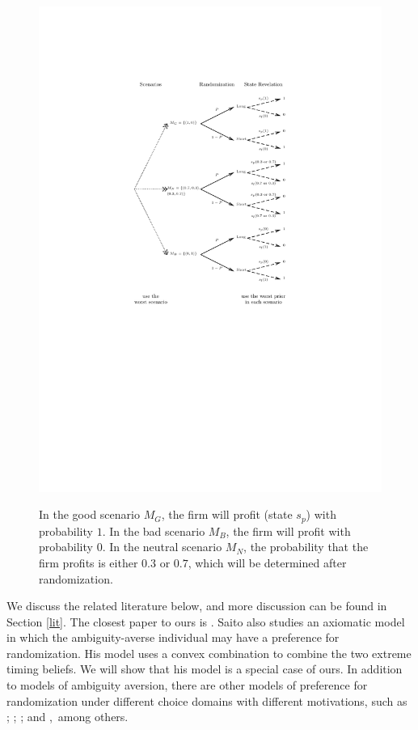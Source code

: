 \documentclass[12pt, notitlepage]{article}
\begin{document}
\begin{figure}[h!]
  \centering   \label{fig_intro_eg3}
    \includegraphics{img/intro_eg3.pdf}
    \caption{In the good
scenario $M_{G}$, the firm will profit (state $s_{p}$) with probability $1$.
In the bad scenario $M_{B}$, the firm will profit with probability $0$. In
the neutral scenario $M_{N}$, the probability that the firm profits is
either $0.3$ or $0.7$, which will be determined after randomization.}
\end{figure}


We discuss the related literature below, and more discussion can be found in
Section \ref{lit}. The closest paper to ours is \cite{Saito15}. Saito also
studies an axiomatic model in which the ambiguity-averse individual may have
a preference for randomization. His model uses a convex combination to
combine the two extreme timing beliefs. We will show that his model is a
special case of ours. In addition to models of ambiguity aversion, there are
other models of preference for randomization under different choice domains
with different motivations, such as \cite{Machina85}; \cite%
{Cerreia-VioglioDillenbergerOrtoleva15}; \cite{FudenbergIijimaStrzalecki15};
and \cite{Cerreia-VioglioDillenbergerOrtolevaEtAl19},\ among others.
\end{document}
